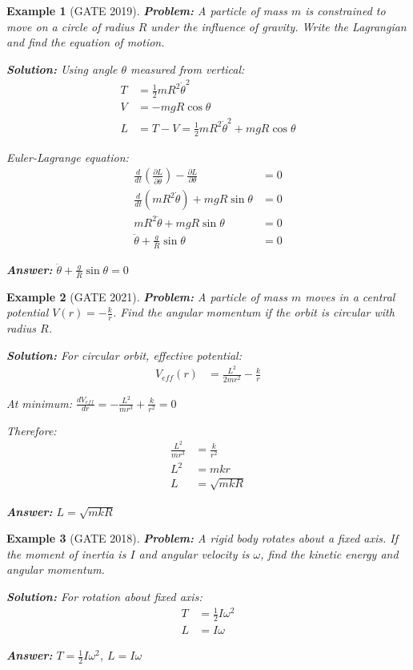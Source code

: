 \documentclass[12pt,a4paper]{article}
\newtheorem{example}{Example}[section]
\newcommand{\ans}[1]{\textcolor{red!70!black}{\textbf{Answer:} #1}}
\newcommand{\sol}{\textcolor{blue!70!black}{\textbf{Solution:}}}
\begin{document}
\begin{example}[GATE 2019]
\textbf{Problem:} A particle of mass $m$ is constrained to move on a circle of radius $R$ under the influence of gravity. Write the Lagrangian and find the equation of motion.

\sol
Using angle $\theta$ measured from vertical:
\begin{align}
T &= \frac{1}{2}mR^2\dot{\theta}^2\\
V &= -mgR\cos\theta\\
L &= T - V = \frac{1}{2}mR^2\dot{\theta}^2 + mgR\cos\theta
\end{align}

Euler-Lagrange equation:
\begin{align}
\frac{d}{dt}\left(\frac{\partial L}{\partial \dot{\theta}}\right) - \frac{\partial L}{\partial \theta} &= 0\\
\frac{d}{dt}(mR^2\dot{\theta}) + mgR\sin\theta &= 0\\
mR^2\ddot{\theta} + mgR\sin\theta &= 0\\
\ddot{\theta} + \frac{g}{R}\sin\theta &= 0
\end{align}

\ans{$\ddot{\theta} + \frac{g}{R}\sin\theta = 0$}
\end{example}

\begin{example}[GATE 2021]
\textbf{Problem:} A particle of mass $m$ moves in a central potential $V(r) = -\frac{k}{r}$. Find the angular momentum if the orbit is circular with radius $R$.

\sol
For circular orbit, effective potential:
\begin{align}
V_{eff}(r) &= \frac{L^2}{2mr^2} - \frac{k}{r}
\end{align}

At minimum: $\frac{dV_{eff}}{dr} = -\frac{L^2}{mr^3} + \frac{k}{r^2} = 0$

Therefore:
\begin{align}
\frac{L^2}{mr^3} &= \frac{k}{r^2}\\
L^2 &= mkr\\
L &= \sqrt{mkR}
\end{align}

\ans{$L = \sqrt{mkR}$}
\end{example}

\begin{example}[GATE 2018]
\textbf{Problem:} A rigid body rotates about a fixed axis. If the moment of inertia is $I$ and angular velocity is $\omega$, find the kinetic energy and angular momentum.

\sol
For rotation about fixed axis:
\begin{align}
T &= \frac{1}{2}I\omega^2\\
L &= I\omega
\end{align}

\ans{$T = \frac{1}{2}I\omega^2$, $L = I\omega$}
\end{example}
\end{document}
